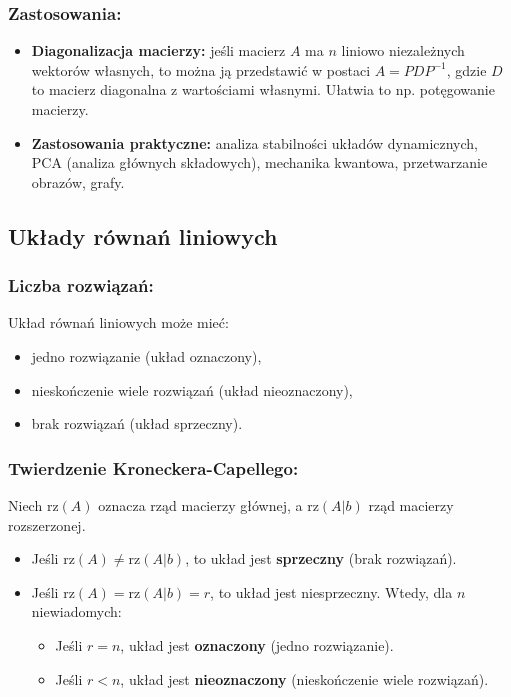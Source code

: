 \subsubsection*{Zastosowania:}
\begin{itemize}
    \item \textbf{Diagonalizacja macierzy:} jeśli macierz $A$ ma $n$ liniowo niezależnych wektorów własnych, to można ją przedstawić w postaci $A = PDP^{-1}$, gdzie $D$ to macierz diagonalna z wartościami własnymi. Ułatwia to np. potęgowanie macierzy.
    \item \textbf{Zastosowania praktyczne:} analiza stabilności układów dynamicznych, PCA (analiza głównych składowych), mechanika kwantowa, przetwarzanie obrazów, grafy.
\end{itemize}

\subsection{Układy równań liniowych}
\subsubsection*{Liczba rozwiązań:}
Układ równań liniowych może mieć:
\begin{itemize}
    \item jedno rozwiązanie (układ oznaczony),
    \item nieskończenie wiele rozwiązań (układ nieoznaczony),
    \item brak rozwiązań (układ sprzeczny).
\end{itemize}

\subsubsection*{Twierdzenie Kroneckera-Capellego:}
Niech $\text{rz}(A)$ oznacza rząd macierzy głównej, a $\text{rz}(A|b)$ rząd macierzy rozszerzonej.
\begin{itemize}
    \item Jeśli $\text{rz}(A) \neq \text{rz}(A|b)$, to układ jest \textbf{sprzeczny} (brak rozwiązań).
    \item Jeśli $\text{rz}(A) = \text{rz}(A|b) = r$, to układ jest niesprzeczny. Wtedy, dla $n$ niewiadomych:
    \begin{itemize}
        \item Jeśli $r = n$, układ jest \textbf{oznaczony} (jedno rozwiązanie).
        \item Jeśli $r < n$, układ jest \textbf{nieoznaczony} (nieskończenie wiele rozwiązań).
    \end{itemize}
\end{itemize}
